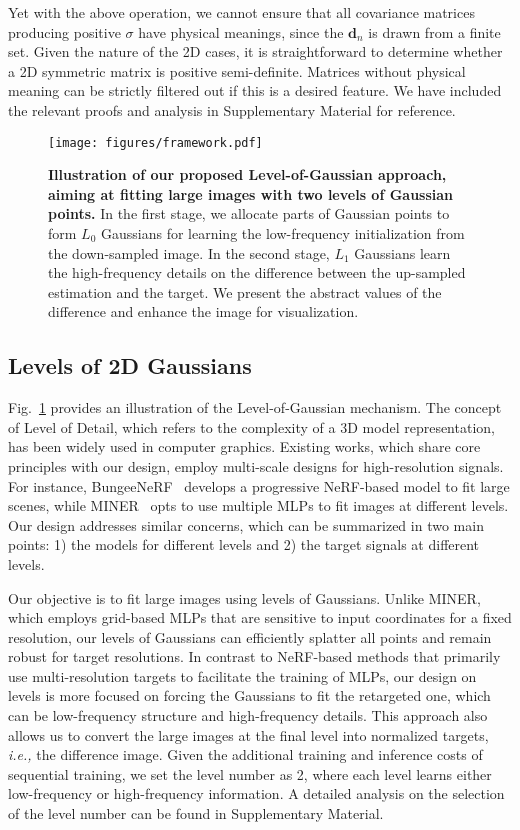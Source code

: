 Yet with the above operation,  we cannot ensure that all covariance matrices producing positive $\sigma$ have physical meanings, since the $\boldsymbol{d}_n$ is drawn from a finite set. Given the nature of the 2D cases, it is straightforward to determine whether a 2D symmetric matrix is positive semi-definite. Matrices without physical meaning can be strictly filtered out if this is a desired feature. We have included the relevant proofs and analysis in Supplementary Material for reference.

\begin{figure}[h]
\centering
\texttt{[image: figures/framework.pdf]}
\caption{\textbf{Illustration of our proposed Level-of-Gaussian approach, aiming at fitting large images with two levels of Gaussian points.} In the first stage, we allocate parts of Gaussian points to form $L_0$ Gaussians for learning the low-frequency initialization from the down-sampled image. In the second stage, $L_1$ Gaussians learn the high-frequency details on the difference between the up-sampled estimation and the target. We present the abstract values of the difference and enhance the image for visualization.}
\label{framework}
\end{figure}

\subsection{Levels of 2D Gaussians}
Fig.~\ref{framework} provides an illustration of the Level-of-Gaussian mechanism. The concept of Level of Detail, which refers to the complexity of a 3D model representation, has been widely used in computer graphics. Existing works, which share core principles with our design, employ multi-scale designs for high-resolution signals. For instance, BungeeNeRF~\cite{xiangli2022bungeenerf} develops a progressive NeRF-based model to fit large scenes, while MINER~\cite{saragadam2022miner} opts to use multiple MLPs to fit images at different levels. Our design addresses similar concerns, which can be summarized in two main points: 1) the models for different levels and 2) the target signals at different levels. 

Our objective is to fit large images using levels of Gaussians. Unlike MINER, which employs grid-based MLPs that are sensitive to input coordinates for a fixed resolution, our levels of Gaussians can efficiently splatter all points and remain robust for target resolutions. In contrast to NeRF-based methods that primarily use multi-resolution targets to facilitate the training of MLPs, our design on levels is more focused on forcing the Gaussians to fit the retargeted one, which can be low-frequency structure and high-frequency details. This approach also allows us to convert the large images at the final level into normalized targets, \textit{i.e.,} the difference image. Given the additional training and inference costs of sequential training, we set the level number as 2, where each level learns either low-frequency or high-frequency information. A detailed analysis on the selection of the level number can be found in Supplementary Material.

